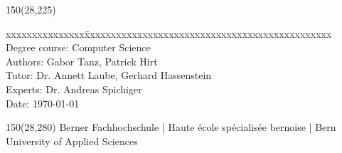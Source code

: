 \begin{titlepage}
\begin{flushleft}
\begin{textblock}{150}(28,225)
\fontsize{10pt}{17pt}\selectfont
\begin{tabbing}
xxxxxxxxxxxxxxx\=xxxxxxxxxxxxxxxxxxxxxxxxxxxxxxxxxxxxxxxxxxxxxxx \kill
Degree course:	\> 	Computer Science \\		%
Authors:		\> 	Gabor Tanz, Patrick Hirt	\\					%
Tutor:	\> Dr. Annett Laube, Gerhard Hassenstein		\\							%
Experts:		\> Dr. Andreas Spichiger				\\							%
Date:			\> \today					\\							%
\end{tabbing}

\end{textblock}
\end{flushleft}

\begin{textblock}{150}(28,280)
\noindent 
\color{bfhgrey}\fontsize{9pt}{10pt}\selectfont
Berner Fachhochschule | Haute \'ecole sp\'ecialis\'ee bernoise | Bern University of Applied Sciences
\color{black}\selectfont
\end{textblock}


\end{titlepage}

%
%
